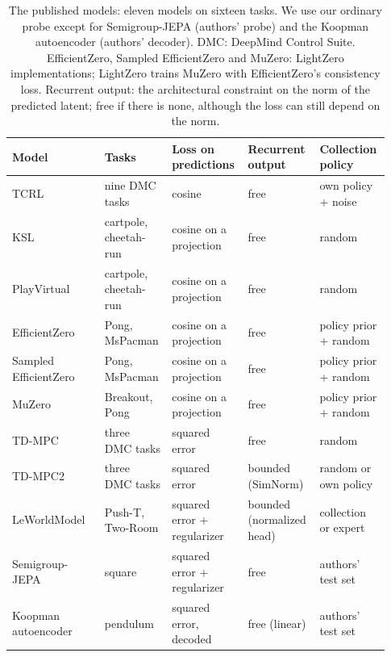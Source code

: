 \begin{table}[t]
\caption{The published models: eleven models on sixteen tasks. We use our ordinary probe except for Semigroup-JEPA (authors' probe) and the Koopman autoencoder (authors' decoder). DMC: DeepMind Control Suite. EfficientZero, Sampled EfficientZero and MuZero: LightZero implementations; LightZero trains MuZero with EfficientZero's consistency loss. Recurrent output: the architectural constraint on the norm of the predicted latent; free if there is none, although the loss can still depend on the norm.}
\label{tab:published_setup}
\centering\footnotesize
\renewcommand{\arraystretch}{1.15}
\setlength{\tabcolsep}{3pt}
\begin{tabular}{@{}>{\raggedright\arraybackslash}p{0.23\linewidth}>{\raggedright\arraybackslash}p{0.16\linewidth}>{\raggedright\arraybackslash}p{0.19\linewidth}>{\raggedright\arraybackslash}p{0.18\linewidth}>{\raggedright\arraybackslash}p{0.17\linewidth}@{}}
\toprule
Model & Tasks & Loss on predictions & Recurrent output & Collection policy \\
\midrule
TCRL~\citep{zhao2023simplified} & nine DMC tasks & cosine & free & own policy + noise \\
KSL~\citep{mcinroe2021learning} & cartpole, cheetah-run & cosine on a projection & free & random \\
PlayVirtual~\citep{yu2021playvirtual} & cartpole, cheetah-run & cosine on a projection & free & random \\
EfficientZero~\citep{ye2021mastering} & Pong, MsPacman & cosine on a projection & free & policy prior + random \\
Sampled EfficientZero~\citep{hubert2021learning} & Pong, MsPacman & cosine on a projection & free & policy prior + random \\
MuZero~\citep{Schrittwieser2020} & Breakout, Pong & cosine on a projection & free & policy prior + random \\
TD-MPC~\citep{hansen2022temporal} & three DMC tasks & squared error & free & random \\
TD-MPC2~\citep{Hansen2023} & three DMC tasks & squared error & bounded (SimNorm) & random or own policy \\
LeWorldModel~\citep{maes2026leworldmodel} & Push-T, Two-Room & squared error + regularizer & bounded (normalized head) & collection or expert \\
Semigroup-JEPA~\citep{Liu2026SemigroupJEPA} & square & squared error + regularizer & free & authors' test set \\
Koopman autoencoder~\citep{Azencot2020} & pendulum & squared error, decoded & free (linear) & authors' test set \\
\bottomrule
\end{tabular}
\end{table}

